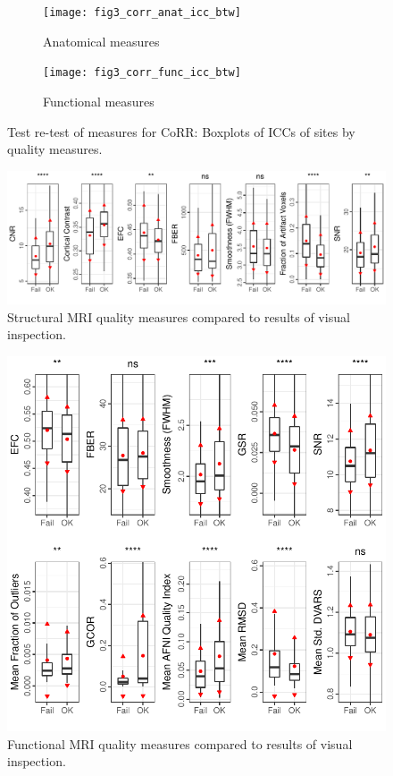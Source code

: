 \begin{figure}[!ht]
  \centering
     \begin{subfigure}[b]{0.4\textwidth}
       \texttt{[image: fig3\_corr\_anat\_icc\_btw]}
       \caption{Anatomical measures}
     \end{subfigure}
     \begin{subfigure}[b]{0.4\textwidth}
       \texttt{[image: fig3\_corr\_func\_icc\_btw]}
       \caption{Functional measures}
     \end{subfigure}
     \caption{Test re-test of measures for CoRR: Boxplots of ICCs of sites by quality measures.}
\end{figure}

\begin{figure}[!ht]
  \centering
    \includegraphics[]{data_analysis/abide_anat_qc}

  \caption{Structural MRI quality measures compared to results of visual inspection.}
\end{figure}

\begin{figure}[!ht]
  \centering
    \includegraphics[]{data_analysis/abide_func_qc}
    \caption{Functional MRI quality measures compared to results of visual inspection.}
  \end{figure}
